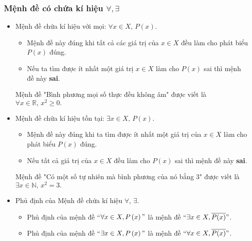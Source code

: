 \subsubsection{Mệnh đề có chứa kí hiệu $\forall, \exists$}
	\begin{itemize}
		\item[\iconMT] Mệnh đề chứa kí hiệu với mọi: $\forall x \in X,\, P(x) $.
	\begin{boxkn}
		\begin{itemize}
			\item Mệnh đề này đúng khi tất cả các giá trị của $x \in X$ đều làm cho phát biểu $P(x)$ đúng.
			\item Nếu ta tìm được ít nhất một giá trị $x \in X$ làm cho $P(x)$ sai thì mệnh đề này \textbf{sai}.
		\end{itemize}
	\end{boxkn}
		\begin{vd}
			Mệnh đề "Bình phương mọi số thực đều không âm" được viết là
			$\forall x \in \mathbb{R},\, x^2 \ge 0.$
		\end{vd}
		\item[\iconMT] Mệnh đề chứa kí hiệu tồn tại: $\exists x \in X,\, P(x) $.
	\begin{boxkn}
		\begin{itemize}
			\item Mệnh đề này đúng khi ta tìm được ít nhất một giá trị của $x \in X$ làm cho phát biểu $P(x)$ đúng.
			\item Nếu tất cả giá trị của $x \in X$ đều làm cho $P(x)$ sai thì mệnh đề này \textbf{sai}.
		\end{itemize}
	\end{boxkn}
		\begin{vd}
			Mệnh đề "Có một số tự nhiên mà bình phương của nó bằng 3" được viết là
			$\exists x \in \mathbb{N},\, x^2=3.$
		\end{vd}
		\item[\iconMT] Phủ định của Mệnh đề chứa kí hiệu $\forall $, $\exists $.
	\begin{boxkn}
		\begin{itemize}
			\item Phủ định của mệnh đề ``$\forall x\in X,P\left( x \right)"$ là mệnh đề ``$\exists x\in X,\overline{P(x)}"$.
			\item Phủ định của mệnh đề ``$\exists x\in X,P\left( x \right)"$ là mệnh đề ``$\forall x\in X,\overline{P(x)}"$.
		\end{itemize}
	\end{boxkn}
	\end{itemize}